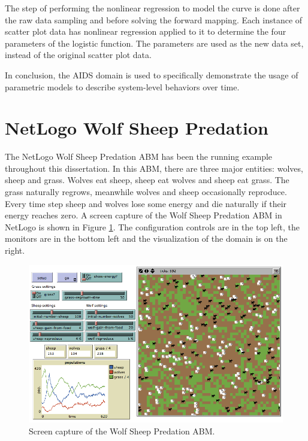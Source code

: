 The step of performing the nonlinear regression to model the curve is done after the raw data sampling and before solving the forward mapping.
Each instance of scatter plot data has nonlinear regression applied to it to determine the four parameters of the logistic function.
The parameters are used as the new data set, instead of the original scatter plot data.

In conclusion, the AIDS domain is used to specifically demonstrate the usage of parametric models to describe system-level behaviors over time.



 \section{NetLogo Wolf Sheep Predation}
The NetLogo Wolf Sheep Predation ABM has been the running example throughout this dissertation.
In this ABM, there are three major entities: wolves, sheep and grass.
Wolves eat sheep, sheep eat wolves and sheep eat grass.
The grass naturally regrows, meanwhile wolves and sheep occasionally reproduce.
Every time step sheep and wolves lose some energy and die naturally if their energy reaches zero.
A screen capture of the Wolf Sheep Predation ABM in NetLogo is shown in Figure \ref{fig:wolfsheepss}.
The configuration controls are in the top left, the monitors are in the bottom left and the visualization of the domain is on the right.

\begin{figure}[ht]
\centering
\includegraphics[scale=.4]{images/wolfsheep_ss.png}
\caption{Screen capture of the Wolf Sheep Predation ABM.}
\label{fig:wolfsheepss}
\end{figure}

